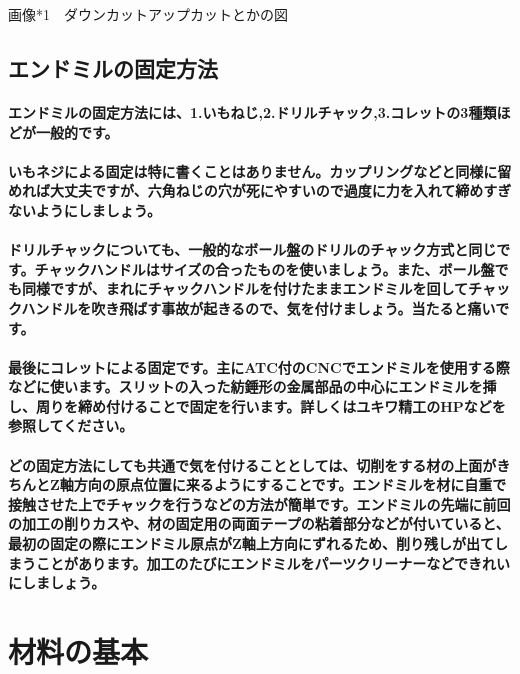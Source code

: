 \documentclass[b5paper, 9pt, twocolumn, titlepage,openany]{jsbook}%
\begin{document}
画像*1　ダウンカットアップカットとかの図

\subsection{エンドミルの固定方法}

\paragraph{エンドミルの固定方法には、1.いもねじ,2.ドリルチャック,3.コレットの3種類ほどが一般的です。}
\paragraph{いもネジによる固定は特に書くことはありません。カップリングなどと同様に留めれば大丈夫ですが、六角ねじの穴が死にやすいので過度に力を入れて締めすぎないようにしましょう。}
\paragraph{ドリルチャックについても、一般的なボール盤のドリルのチャック方式と同じです。チャックハンドルはサイズの合ったものを使いましょう。また、ボール盤でも同様ですが、まれにチャックハンドルを付けたままエンドミルを回してチャックハンドルを吹き飛ばす事故が起きるので、気を付けましょう。当たると痛いです。}
\paragraph{最後にコレットによる固定です。主にATC付のCNCでエンドミルを使用する際などに使います。スリットの入った紡錘形の金属部品の中心にエンドミルを挿し、周りを締め付けることで固定を行います。詳しくはユキワ精工のHPなどを参照してください。}
\paragraph{どの固定方法にしても共通で気を付けることとしては、切削をする材の上面がきちんとZ軸方向の原点位置に来るようにすることです。エンドミルを材に自重で接触させた上でチャックを行うなどの方法が簡単です。エンドミルの先端に前回の加工の削りカスや、材の固定用の両面テープの粘着部分などが付いていると、最初の固定の際にエンドミル原点がZ軸上方向にずれるため、削り残しが出てしまうことがあります。加工のたびにエンドミルをパーツクリーナーなどできれいにしましょう。}

\section{材料の基本}
\end{document}
